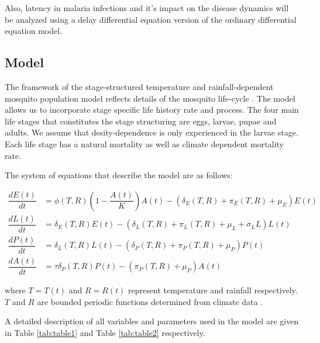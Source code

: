 \documentclass[12pt,a4paper,titlepage]{article}
\begin{document}
Also, latency in malaria infections and it's impact on the disease dynamics will be analyzed using a delay differential equation version of the ordinary differential equation model.


\subsection{Model}
The framework of the stage-structured temperature and rainfall-dependent mosquito population model reflects details of the mosquito life-cycle \cite{abdelrazec2017mathematical, hamdan2020effect, beck2013effect, ewing2016modelling}. The model allows us to incorporate stage specific life history rate and process. The four main life stages that constitutes the stage structuring are eggs, larvae, pupae and adults. We assume that desity-dependence is only experienced in the larvae stage. Each life stage has a natural mortality as well as climate dependent mortality rate.  

The system of equations that describe the model are as follows:


\begin{subequations}
	\label{mosquito_model}
	\begin{align}
\dfrac{dE(t)}{dt} &= \phi (T, R)\left(1-\dfrac{A(t)}{K}\right)A(t) - \left( \delta_E(T, R)  + \pi_E(T, R)+ \mu_E\right)E(t)\\
\dfrac{dL(t)}{dt} &= \delta_E(T, R)E(t) - \left( \delta_L(T, R)  + \pi_L(T, R)+ \mu_L + \sigma_L L\right)L(t)\\
\dfrac{dP(t)}{dt} &= \delta_L(T, R)L(t) - \left( \delta_P(T, R)  + \pi_P(T, R)+ \mu_P \right)P(t)\\
\dfrac{dA(t)}{dt} &= \tau \delta_P(T, R)P(t) - \left( \pi_P(T, R)+ \mu_P \right)A(t)
	\end{align}
\end{subequations}

where $T = T(t)$ and $R=R(t)$ represent temperature and rainfall respectively. $T$ and $R$ are bounded periodic functions determined from climate data \cite{abdelrazec2017mathematical}.

A detailed description of all variables and parameters used in the model are given in Table \ref{tab:table1} and Table \ref{tab:table2} respectively. 
\end{document}
